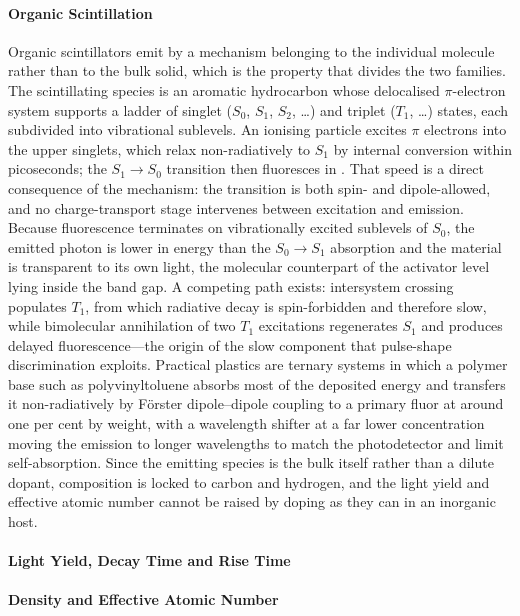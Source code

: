 \paragraph{Organic Scintillation}
Organic scintillators emit by a mechanism belonging to the individual molecule rather than to the bulk solid, which is the property that divides the two families.
The scintillating species is an aromatic hydrocarbon whose delocalised $\pi$-electron system supports a ladder of singlet ($S_0$, $S_1$, $S_2$, \dots) and triplet ($T_1$, \dots) states, each subdivided into vibrational sublevels.
An ionising particle excites $\pi$ electrons into the upper singlets, which relax non-radiatively to $S_1$ by internal conversion within picoseconds; the $S_1 \rightarrow S_0$ transition then fluoresces in .
That speed is a direct consequence of the mechanism: the transition is both spin- and dipole-allowed, and no charge-transport stage intervenes between excitation and emission.
Because fluorescence terminates on vibrationally excited sublevels of $S_0$, the emitted photon is lower in energy than the $S_0 \rightarrow S_1$ absorption and the material is transparent to its own light, the molecular counterpart of the activator level lying inside the band gap.
A competing path exists: intersystem crossing populates $T_1$, from which radiative decay is spin-forbidden and therefore slow, while bimolecular annihilation of two $T_1$ excitations regenerates $S_1$ and produces delayed fluorescence---the origin of the slow component that pulse-shape discrimination exploits.
Practical plastics are ternary systems in which a polymer base such as polyvinyltoluene absorbs most of the deposited energy and transfers it non-radiatively by F\"orster dipole--dipole coupling to a primary fluor at around one per cent by weight, with a wavelength shifter at a far lower concentration moving the emission to longer wavelengths to match the photodetector and limit self-absorption.
Since the emitting species is the bulk itself rather than a dilute dopant, composition is locked to carbon and hydrogen, and the light yield and effective atomic number cannot be raised by doping as they can in an inorganic host.

\paragraph{Light Yield, Decay Time and Rise Time}

\paragraph{Density and Effective Atomic Number}

